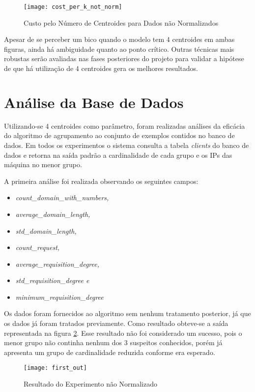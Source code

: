 \begin{figure}[htbp]
\centering
\texttt{[image: cost\_per\_k\_not\_norm]}
\caption[Custo pelo Número de Centroides para Dados não Normalizados]{Custo pelo Número de Centroides para Dados não Normalizados} \label{fig:cost_per_k_not_norm}
\end{figure}

Apesar de se perceber um bico quando o modelo tem 4 centroides em ambas figuras, ainda há ambiguidade quanto ao ponto crítico. Outras técnicas mais robustas serão avaliadas nas fases posteriores do projeto para validar a hipótese de que há utilização de 4 centroides gera os melhores resultados.

\section{Análise da Base de Dados}

Utilizando-se 4 centroides como parâmetro, foram realizadas análises da eficácia do algoritmo de agrupamento ao conjunto de exemplos contidos no banco de dados. Em todos os experimentos o sistema consulta a tabela \textit{clients} do banco de dados e retorna na saída padrão a cardinalidade de cada grupo e os IPs das máquina no menor grupo.

A primeira análise foi realizada observando os seguintes campos:

\begin{itemize}
\item \textit{count\_domain\_with\_numbers, }
\item \textit{average\_domain\_length, }
\item \textit{std\_domain\_length, }
\item \textit{count\_request, }
\item \textit{average\_requisition\_degree, }
\item \textit{std\_requisition\_degree e }
\item \textit{minimum\_requisition\_degree }
\end{itemize}

Os dados foram fornecidos ao algoritmo sem nenhum tratamento posterior, já que os dados já foram tratados previamente. Como resultado obteve-se a saída representada na figura \ref{fig:first_out}. Esse resultado não foi considerado um sucesso, pois o menor grupo não continha nenhum dos 3 suspeitos conhecidos, porém já apresenta um grupo de cardinalidade reduzida conforme era esperado.

\begin{figure}[htbp]
\centering
\texttt{[image: first\_out]}
\caption[Resultado do Experimento não Normalizado]{Resultado do Experimento não Normalizado} \label{fig:first_out}
\end{figure}

